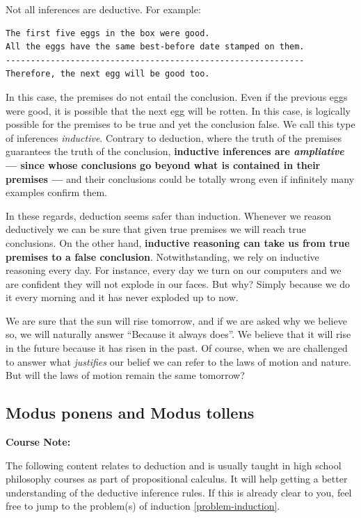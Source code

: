 \documentclass[
]{book}
\begin{document}
Not all inferences are deductive. For example:

\begin{verbatim}
The first five eggs in the box were good.
All the eggs have the same best-before date stamped on them.
------------------------------------------------------------
Therefore, the next egg will be good too.
\end{verbatim}

In this case, the premises do not entail the conclusion. Even if the previous eggs were good, it is possible that the next egg will be rotten. In this case, is logically possible for the premises to be true and yet the conclusion false. We call this type of inferences \emph{inductive}. Contrary to deduction, where the truth of the premises guarantees the truth of the conclusion, \textbf{inductive inferences are \emph{ampliative} --- since whose conclusions go beyond what is contained in their premises ---} and their conclusions could be totally wrong even if infinitely many examples confirm them. \citep{bergadano1991problem}

In these regards, deduction seems safer than induction. Whenever we reason deductively we can be sure that given true premises we will reach true conclusions. On the other hand, \textbf{inductive reasoning can take us from true premises to a false conclusion}. Notwithstanding, we rely on inductive reasoning every day. For instance, every day we turn on our computers and we are confident they will not explode in our faces. \citep{okasha-pos} But why? Simply because we do it every morning and it has never exploded up to now.

We are sure that the sun will rise tomorrow, and if we are asked why we believe so, we will naturally answer ``Because it always does''. We believe that it will rise in the future because it has risen in the past. Of course, when we are challenged to answer what \emph{justifies} our belief we can refer to the laws of motion and nature. But will the laws of motion remain the same tomorrow? \citep{russell2001problems}

\hypertarget{modus}{%
\subsection{Modus ponens and Modus tollens}\label{modus}}

\begin{notebox}

\begin{center}
\textbf{Course Note:}

\end{center}

The following content relates to deduction and is usually taught in high school philosophy courses as part of propositional calculus. It will help getting a better understanding of the deductive inference rules. If this is already clear to you, feel free to jump to the problem(s) of induction \ref{problem-induction}.

\end{notebox}
\end{document}
